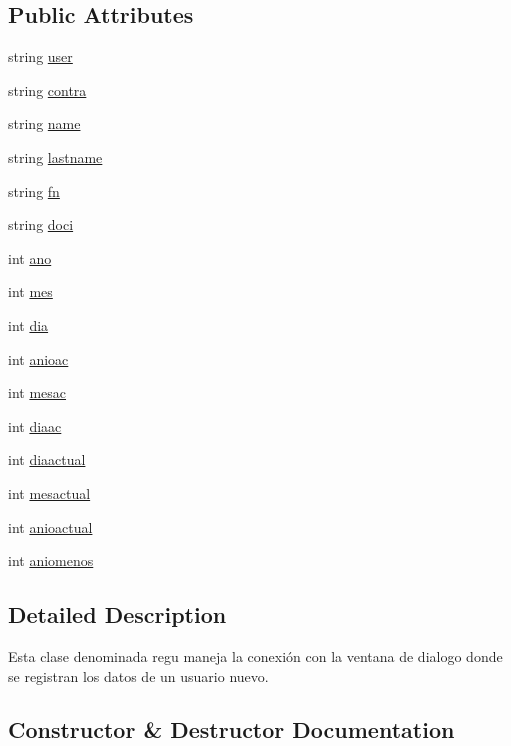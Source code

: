 \subsection*{Public Attributes}
\begin{DoxyCompactItemize}
\item 
string \hyperlink{classregu_a22cc21aa95246c8b198c0e43dc932c9b}{user}
\item 
string \hyperlink{classregu_a5293f6cb33494cf1701c643b2ff17b4b}{contra}
\item 
string \hyperlink{classregu_a5f9ec0ff54143b14c6cd04f360c04d2c}{name}
\item 
string \hyperlink{classregu_a676bef339cfb36f368ca41f2089268d1}{lastname}
\item 
string \hyperlink{classregu_ae71ceda1a90a9836dbf263eaa3bf9a84}{fn}
\item 
string \hyperlink{classregu_a3f72e08908b7acc437d924ee9619438b}{doci}
\item 
int \hyperlink{classregu_a6e25f0b6f043c6f8c563e07b557e90be}{ano}
\item 
int \hyperlink{classregu_aa428968b67b0b19475ba8570238a04fd}{mes}
\item 
int \hyperlink{classregu_a224486fd0b438d8c2fa9339e0df2e2d3}{dia}
\item 
int \hyperlink{classregu_a8e1e0b50d736177379adb192386bba2d}{anioac}
\item 
int \hyperlink{classregu_a132dfdf2c854220e77bd72ef8512f0bd}{mesac}
\item 
int \hyperlink{classregu_a744f894213a241d94323fea13158ea46}{diaac}
\item 
int \hyperlink{classregu_aced7d6b844bf254badde988ba1544d4f}{diaactual}
\item 
int \hyperlink{classregu_ae5fe72d4503fe08944e2d439aca203c6}{mesactual}
\item 
int \hyperlink{classregu_a9a71f2940cd6150de74b89f063682ce1}{anioactual}
\item 
int \hyperlink{classregu_a79d9c62c9fc46b699f5985b693525bfb}{aniomenos}
\end{DoxyCompactItemize}


\subsection{Detailed Description}
Esta clase denominada regu maneja la conexión con la ventana de dialogo donde se registran los datos de un usuario nuevo. 

\subsection{Constructor \& Destructor Documentation}
\mbox{\label{classregu_a4233920e912063eba919a7031cadc10a}} 
